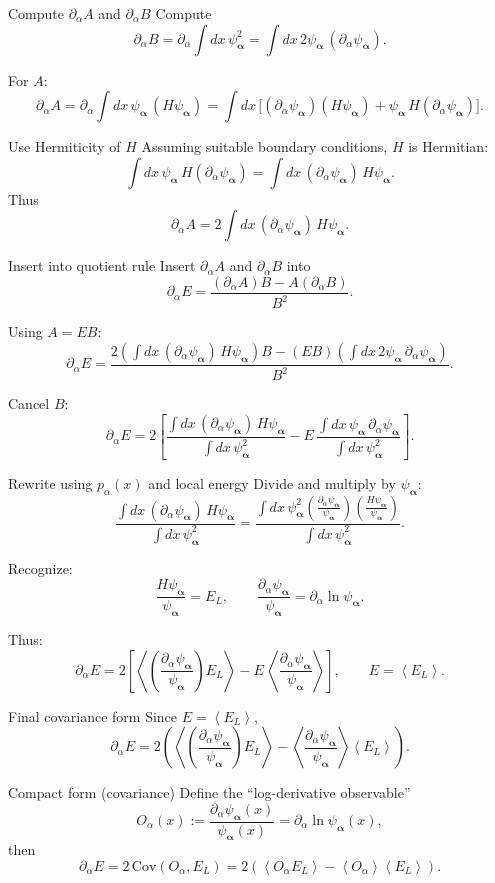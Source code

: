 \documentclass[aspectratio=169]{beamer}
\newcommand{\avg}[1]{\left\langle #1 \right\rangle}
\newcommand{\psia}{\psi_{\bm{\alpha}}}
\newcommand{\dalpha}{\partial_{\alpha}}
\newcommand{\El}{E_L}
\begin{document}
\begin{frame}{Compute $\partial_\alpha A$ and $\partial_\alpha B$}
Compute
\[
\dalpha B = \dalpha \int dx\, \psia^2
= \int dx\, 2\psia\, (\dalpha \psia).
\]

For $A$:
\[
\dalpha A
= \dalpha \int dx\, \psia\, (H\psia)
= \int dx\, \Big[(\dalpha \psia)(H\psia) + \psia\, H(\dalpha \psia)\Big].
\]

\begin{block}{Use Hermiticity of $H$}
Assuming suitable boundary conditions, $H$ is Hermitian:
\[
\int dx\, \psia\, H(\dalpha \psia) = \int dx\, (\dalpha \psia)\, H\psia.
\]
Thus
\[
\dalpha A = 2\int dx\, (\dalpha \psia)\, H\psia.
\]
\end{block}
\end{frame}

\begin{frame}{Insert into quotient rule}
Insert $\dalpha A$ and $\dalpha B$ into
\[
\dalpha E = \frac{(\dalpha A)B - A(\dalpha B)}{B^2}.
\]

Using $A = EB$:
\[
\dalpha E
= \frac{2\left(\int dx\, (\dalpha \psia)\, H\psia\right)B
- (EB)\left(\int dx\, 2\psia\, \dalpha\psia\right)}{B^2}.
\]

Cancel $B$:
\[
\dalpha E
= 2\left[
\frac{\int dx\, (\dalpha \psia)\, H\psia}{\int dx\, \psia^2}
- E\,\frac{\int dx\, \psia\, \dalpha\psia}{\int dx\, \psia^2}
\right].
\]
\end{frame}

\begin{frame}{Rewrite using $p_{\alpha}(x)$ and local energy}
Divide and multiply by $\psia$:
\[
\frac{\int dx\, (\dalpha \psia)\, H\psia}{\int dx\, \psia^2}
=
\frac{\int dx\, \psia^2 \left(\frac{\dalpha \psia}{\psia}\right)
\left(\frac{H\psia}{\psia}\right)}{\int dx\, \psia^2}.
\]

Recognize:
\[
\frac{H\psia}{\psia}=\El,
\qquad
\frac{\dalpha\psia}{\psia} = \dalpha \ln \psia.
\]

Thus:
\[
\dalpha E
= 2\left[
\avg{\left(\frac{\dalpha\psia}{\psia}\right)\El}
- E\,\avg{\frac{\dalpha\psia}{\psia}}
\right],
\qquad E=\avg{\El}.
\]
\end{frame}

\begin{frame}{Final covariance form}
Since $E=\avg{\El}$,
\[
\dalpha E
=
2\left(
\avg{\left(\frac{\dalpha\psia}{\psia}\right)\El}
-\avg{\frac{\dalpha\psia}{\psia}}\avg{\El}
\right).
\]

\begin{block}{Compact form (covariance)}
Define the ``log-derivative observable''
\[
O_\alpha(x):=\frac{\dalpha\psia(x)}{\psia(x)}=\dalpha \ln \psia(x),
\]
then
\[
\boxed{
\dalpha E = 2\,\mathrm{Cov}\!\left(O_\alpha,\El\right)
=2\left(\avg{O_\alpha \El}-\avg{O_\alpha}\avg{\El}\right).
}
\]
\end{block}
\end{frame}
\end{document}

